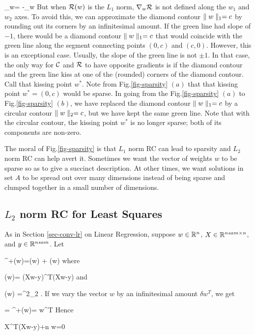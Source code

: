 \beq
\nabla_w\calc = -\nabla_w \calr
\eeq
But when ${\cal R}(w)$ is
the $L_1$ norm,  $\nabla_w{\cal R}$ is not defined along the $w_1$
and $w_2$ axes. To avoid this, we can 
approximate the diamond contour $\parallel w\parallel_1=c$
by rounding out its corners
by an infinitesimal amount. If the green line had 
slope of $-1$,
there would be a diamond contour
 $\parallel w\parallel_1=c$ that would coincide with the green line along the 
 segment connecting points $(0,c)$
 and $(c,0)$. However, this is an exceptional case. Usually, the slope
 of the green line is not $\pm 1$.
 In that case, the only way for 
 ${\cal C}$ and ${\cal R}$ to have
 opposite gradients is if the diamond 
 contour and the green line 
 kiss at one of the (rounded)  corners
 of the diamond contour. Call that
 kissing point $w^*$. Note from
 Fig.\ref{fig-sparsity} $(a)$ that that kissing point $w^*=(0,c)$ would be
 sparse. In going from the Fig.\ref{fig-sparsity} $(a)$ to Fig.\ref{fig-sparsity} $(b)$,
 we have replaced the diamond contour
 $\parallel w\parallel_1=c$ by
 a circular contour $\parallel w\parallel_2=c$,
 but we have kept the same green line.
 Note that with the circular contour,
 the kissing point $w^*$ is no longer sparse; both of its components are non-zero.
 
 The moral of Fig.\ref{fig-sparsity}
 is that $L_1$ norm RC can lead to sparsity and $L_2$ norm RC can help avert it.
 Sometimes we want the vector of weights $w$ to be sparse so as to give
 a succinct description.
 At other times, we want solutions in set $A$ to be spread out over many dimensions instead of being sparse and clumped together in a small number of dimensions.






\subsection{$L_2$ norm RC for Least Squares}
As in Section \ref{sec-conv-lr} on Linear Regression, 
suppose $w\in{ \mathbb{R}}^n$, $X\in { \mathbb{R}}^{nsam\times n}$,
 and  $y\in{ \mathbb{R}}^{nsam} $. Let

\beq
\calc^+(w)=\calc(w) + \calr(w)
\eeq
where

\beq
\calc(w)=
(Xw-y)^T(Xw-y)
\eeq
and

\beq
\calr(w) =\lam{}^2_2
\;.
\eeq
If we vary the  vector $w$ by an
infinitesimal amount $\delta w^T$, we get

= \delta\calc^+(w)=
\delta w^T
\eeq
Hence

\beq
X^T(Xw-y)+\lam n  w=0
\eeq

